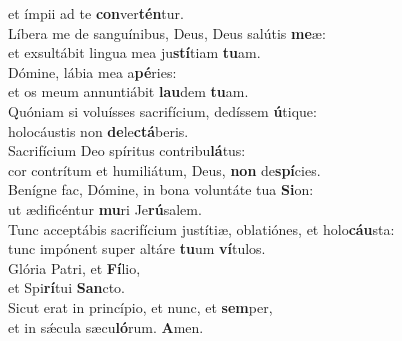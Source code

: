 \evenverse et ímpii ad te \textbf{con}ver\textbf{tén}tur.\\
\oddverse Líbera me de sanguínibus, Deus, Deus salútis \textbf{me}æ:~\*\\
\oddverse et exsultábit lingua mea ju\textbf{stí}tiam \textbf{tu}am.\\
\evenverse Dómine, lábia mea a\textbf{pé}ries:~\*\\
\evenverse et os meum annuntiábit \textbf{lau}dem \textbf{tu}am.\\
\oddverse Quóniam si voluísses sacrifícium, dedíssem \textbf{ú}tique:~\*\\
\oddverse holocáustis non \textbf{de}le\textbf{ctá}beris.\\
\evenverse Sacrifícium Deo spíritus contribu\textbf{lá}tus:~\*\\
\evenverse cor contrítum et humiliátum, Deus, \textbf{non} de\textbf{spí}cies.\\
\oddverse Benígne fac, Dómine, in bona voluntáte tua \textbf{Si}on:~\*\\
\oddverse ut ædificéntur \textbf{mu}ri Je\textbf{rú}salem.\\
\evenverse Tunc acceptábis sacrifícium justítiæ, oblatiónes, et holo\textbf{cáu}sta:~\*\\
\evenverse tunc impónent super altáre \textbf{tu}um \textbf{ví}tulos.\\
\oddverse Glória Patri, et \textbf{Fí}lio,~\*\\
\oddverse et Spi\textbf{rí}tui \textbf{San}cto.\\
\evenverse Sicut erat in princípio, et nunc, et \textbf{sem}per,~\*\\
\evenverse et in sǽcula sæcu\textbf{ló}rum. \textbf{A}men.\\
